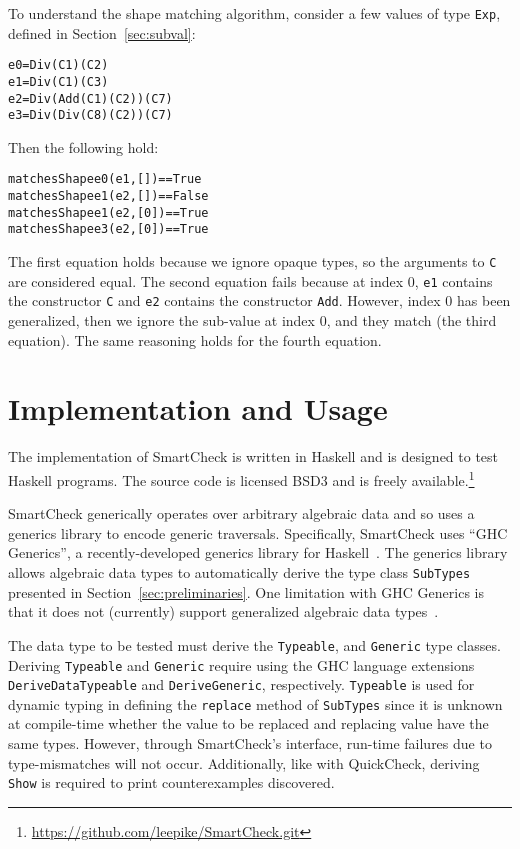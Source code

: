 \documentclass{sigplanconf}
\newenvironment{code}{\begin{alltt}}{\end{alltt}}
\newcommand{\ttp}[1]{\texttt{#1}}
\begin{document}
To understand the shape matching algorithm, consider a few values of type
\ttp{Exp}, defined in Section~\ref{sec:subval}:
%
\begin{code}
e0 = Div (C 1) (C 2)
e1 = Div (C 1) (C 3)
e2 = Div (Add (C 1) (C 2)) (C 7)
e3 = Div (Div (C 8) (C 2)) (C 7)
\end{code}
%
\noindent
Then the following hold:
%
\begin{code}
matchesShape e0 (e1, [])  == True
matchesShape e1 (e2, [])  == False
matchesShape e1 (e2, [0]) == True
matchesShape e3 (e2, [0]) == True
\end{code}
%
The first equation holds because we ignore opaque types, so the arguments to
\ttp{C} are considered equal.  The second equation fails because at index 0,
\ttp{e1} contains the constructor \ttp{C} and \ttp{e2} contains the constructor
\ttp{Add}.  However, index 0 has been generalized, then we ignore the sub-value
at index 0, and they match (the third equation).  The same reasoning holds for
the fourth equation.


\section{Implementation and Usage}\label{sec:implementation}

The implementation of SmartCheck is written in Haskell and is designed to test
Haskell programs.  The source code is licensed BSD3 and is freely
available.\footnote{\url{https://github.com/leepike/SmartCheck.git}}

SmartCheck generically operates over arbitrary algebraic data and so uses a
generics library to encode generic traversals.  Specifically, SmartCheck uses
``GHC Generics'', a recently-developed generics library for
Haskell~\cite{generics}.  The generics library allows algebraic data types to
automatically derive the type class \ttp{SubTypes} presented in
Section~\ref{sec:preliminaries}.  One limitation with GHC Generics is that it
does not (currently) support generalized algebraic data types~\cite{gadts}.

The data type to be tested must derive the \ttp{Typeable}, and \ttp{Generic}
type classes.  Deriving \ttp{Typeable} and \ttp{Generic} require using the GHC
language extensions \ttp{DeriveDataTypeable} and \ttp{DeriveGeneric},
respectively.  \ttp{Typeable} is used for dynamic typing in defining the
\ttp{replace} method of \ttp{SubTypes} since it is unknown at compile-time
whether the value to be replaced and replacing value have the same types.
However, through SmartCheck's interface, run-time failures due to
type-mismatches will not occur.  Additionally, like with QuickCheck, deriving
\ttp{Show} is required to print counterexamples discovered.
\end{document}
